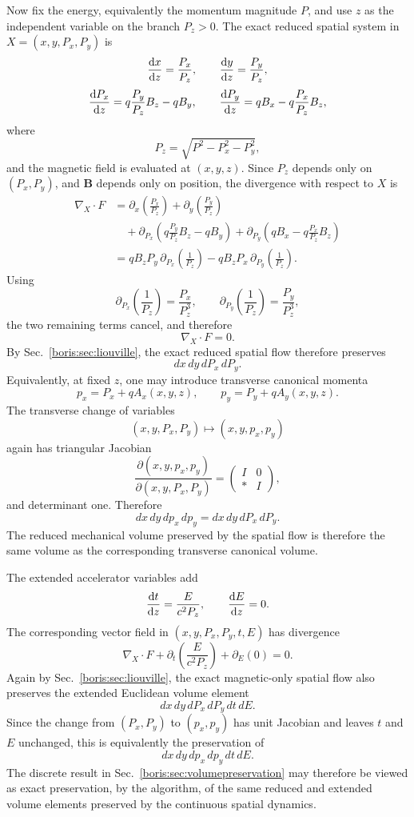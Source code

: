 Now fix the energy, equivalently the momentum magnitude \(P\), and use \(z\)
as the independent variable on the branch \(P_z>0\).  The exact reduced spatial
system in \(X=(x,y,P_x,P_y)\) is
\[
\frac{\text{d} {x}}{\text{d} {z}}=\frac{P_x}{P_z},
\qquad
\frac{\text{d} {y}}{\text{d} {z}}=\frac{P_y}{P_z},
\]
\[
\frac{\text{d} {P_x}}{\text{d} {z}}=q\frac{P_y}{P_z}B_z-qB_y,
\qquad
\frac{\text{d} {P_y}}{\text{d} {z}}=qB_x-q\frac{P_x}{P_z}B_z,
\]
where
\[
P_z=\sqrt{P^2-P_x^2-P_y^2},
\]
and the magnetic field is evaluated at \((x,y,z)\).  Since \(P_z\) depends only
on \((P_x,P_y)\), and \(\bm B\) depends only on position, the divergence with
respect to \(X\) is
\begin{align*}
\nabla_X\cdot F
&=
\partial_x\!\left(\frac{P_x}{P_z}\right)
+\partial_y\!\left(\frac{P_y}{P_z}\right)\\
&\quad
+\partial_{P_x}\!\left(q\frac{P_y}{P_z}B_z-qB_y\right)
+\partial_{P_y}\!\left(qB_x-q\frac{P_x}{P_z}B_z\right)\\
&=
qB_z P_y\,\partial_{P_x}\!\left(\frac{1}{P_z}\right)
-qB_z P_x\,\partial_{P_y}\!\left(\frac{1}{P_z}\right).
\end{align*}
Using
\[
\partial_{P_x}\!\left(\frac{1}{P_z}\right)=\frac{P_x}{P_z^3},
\qquad
\partial_{P_y}\!\left(\frac{1}{P_z}\right)=\frac{P_y}{P_z^3},
\]
the two remaining terms cancel, and therefore
\[
\nabla_X\cdot F=0.
\]
By Sec.~\ref{boris:sec:liouville}, the exact reduced spatial flow therefore
preserves
\[
dx\,dy\,dP_x\,dP_y.
\]
Equivalently, at fixed \(z\), one may introduce transverse canonical momenta
\[
p_x=P_x+qA_x(x,y,z),
\qquad
p_y=P_y+qA_y(x,y,z).
\]
The transverse change of variables
\[
(x,y,P_x,P_y)\mapsto(x,y,p_x,p_y)
\]
again has triangular Jacobian
\[
\frac{\partial(x,y,p_x,p_y)}{\partial(x,y,P_x,P_y)}
=
\begin{pmatrix}
I & 0\\
* & I
\end{pmatrix},
\]
and determinant one.  Therefore
\[
dx\,dy\,dp_x\,dp_y
=
dx\,dy\,dP_x\,dP_y.
\]
The reduced mechanical volume preserved by the spatial flow is therefore the
same volume as the corresponding transverse canonical volume.

The extended accelerator variables add
\[
\frac{\text{d} {t}}{\text{d} {z}}=\frac{E}{c^2P_z},
\qquad
\frac{\text{d} {E}}{\text{d} {z}}=0.
\]
The corresponding vector field in \((x,y,P_x,P_y,t,E)\) has divergence
\[
\nabla_X\cdot F
+\partial_t\!\left(\frac{E}{c^2P_z}\right)
+\partial_E(0)
=0.
\]
Again by Sec.~\ref{boris:sec:liouville}, the exact magnetic-only spatial flow
also preserves the extended Euclidean volume element
\[
dx\,dy\,dP_x\,dP_y\,dt\,dE.
\]
Since the change from \((P_x,P_y)\) to \((p_x,p_y)\) has unit Jacobian and
leaves \(t\) and \(E\) unchanged, this is equivalently the preservation of
\[
dx\,dy\,dp_x\,dp_y\,dt\,dE.
\]
The discrete result in Sec.~\ref{boris:sec:volumepreservation} may therefore be
viewed as exact preservation, by the algorithm, of the same reduced and
extended volume elements preserved by the continuous spatial dynamics.

